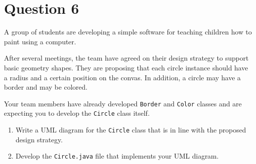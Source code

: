 \documentclass[12pt,letterpaper,twoside]{article}
\begin{document}
\newpage

\section*{Question 6}

A group of students are developing a simple software for teaching children how to paint using a computer.

After several meetings, the team have agreed on their design strategy to support basic geometry shapes.
They are proposing that each circle instance should have a radius and a certain position on the convas. In addition, a circle may have a border and may be colored.

Your team members have already developed \texttt{Border} and \texttt{Color} classes and are expecting you to develop the \texttt{Circle} class itself.

\begin{enumerate}
	\item Write a UML diagram for the \texttt{Circle} class that is in line with the proposed design strategy.
	\item Develop the \texttt{Circle.java} file that implements your UML diagram.
\end{enumerate}
\end{document}

